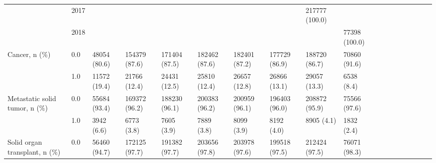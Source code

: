 \begin{tabular}{llllllllllllllllll}
                                       & 2017 &                              &                 &                 &                 &                 &                 &  217777 (100.0) &                &                   &                    &                    &                    &                    &                     &                     &                     \\
                                       & 2018 &                              &                 &                 &                 &                 &                 &                 &  77398 (100.0) &                   &                    &                    &                    &                    &                     &                     &                     \\
Cancer, n (\%) & 0.0 &                 48054 (80.6) &   154379 (87.6) &   171404 (87.5) &   182462 (87.6) &   182401 (87.2) &   177729 (86.9) &   188720 (86.7) &   70860 (91.6) &                   &                    &                    &                    &                    &                     &                     &                     \\
                                       & 1.0 &                 11572 (19.4) &    21766 (12.4) &    24431 (12.5) &    25810 (12.4) &    26657 (12.8) &    26866 (13.1) &    29057 (13.3) &     6538 (8.4) &                   &                    &                    &                    &                    &                     &                     &                     \\
Metastatic solid tumor, n (\%) & 0.0 &                 55684 (93.4) &   169372 (96.2) &   188230 (96.1) &   200383 (96.2) &   200959 (96.1) &   196403 (96.0) &   208872 (95.9) &   75566 (97.6) &                   &                    &                    &                    &                    &                     &                     &                     \\
                                       & 1.0 &                   3942 (6.6) &      6773 (3.8) &      7605 (3.9) &      7889 (3.8) &      8099 (3.9) &      8192 (4.0) &      8905 (4.1) &     1832 (2.4) &                   &                    &                    &                    &                    &                     &                     &                     \\
Solid organ transplant, n (\%) & 0.0 &                 56460 (94.7) &   172125 (97.7) &   191382 (97.7) &   203656 (97.8) &   203978 (97.6) &   199518 (97.5) &   212424 (97.5) &   76071 (98.3) &                   &                    &                    &                    &                    &                     &                     &                     \\

\end{tabular}
